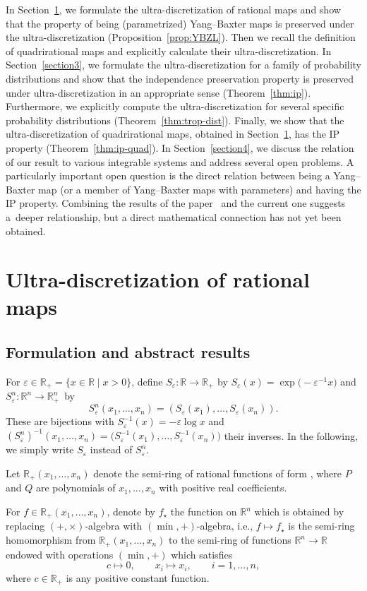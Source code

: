 \documentclass[pdftex]{sigma}
\numberwithin{equation}{section}
\def\R{\mathbb{R}}
\def\e{\varepsilon}
\begin{document}
In Section~\ref{section2}, we formulate the ultra-discretization of rational maps and show that the property of being (parametrized) Yang--Baxter maps is preserved under the ultra-discretization (Proposition~\ref{prop:YBZL}). Then we recall the definition of quadrirational maps and explicitly calculate their ultra-discretization. In Section~\ref{section3}, we formulate the ultra-discretization for a family of probability distributions and show that the independence preservation property is preserved under ultra-discretization in an appropriate sense (Theorem~\ref{thm:ip}). Furthermore, we explicitly compute the ultra-discretization for several specific probability distributions (Theorem~\ref{thm:trop-dist}). Finally, we show that the ultra-discretization of quadrirational maps, obtained in Section~\ref{section2}, has the IP property (Theorem~\ref{thm:ip-quad}). In Section~\ref{section4}, we discuss the relation of our result to various integrable systems and address several open problems. A particularly important open question is the direct relation between being a Yang--Baxter map (or a member of Yang--Baxter maps with parameters) and having the IP property. Combining the results of the paper~\cite{SU} and the current one suggests a~deeper relationship, but a direct mathematical connection has not yet been obtained.

\section{Ultra-discretization of rational maps}\label{section2}

\subsection{Formulation and abstract results}
For $\e\in\R_+\!=\!\{x\in\R\mid x>0\}$,
define $S_{\e}\colon\R\to\R_+$ by $S_{\e}(x)=\exp\bigl(-\e^{-1}x\bigr)$ and ${S_{\e}^n\colon \R^n\to\R_+^n}$~by%
\[
S_{\e}^n(x_1,\ldots,x_n)=(S_{\e}(x_1),\ldots,S_{\e}(x_n)).
\]
These are bijections with $S_{\e}^{-1}(x)=-\e\log x$ and
$(S_{\e}^n)^{-1}(x_1,\ldots,x_n)=\bigl(S_{\e}^{-1}(x_1),\ldots,S_{\e}^{-1}(x_n)\bigr)$ their inverses.
In the following, we simply write $S_{\e}$ instead of $S_{\e}^n$.

Let $\R_+(x_1,\ldots,x_n)$ denote the semi-ring of rational functions of
form , where $P$ and $Q$ are
polynomials of $x_1,\ldots,x_n$ with positive real coefficients.

For $f\in\R_+(x_1,\ldots,x_n)$, denote by $f_{\star}$ the function on $\R^n$ which is obtained by replacing $(+,\times)$-algebra with $(\min,+)$-algebra, i.e.,
$f\mapsto f_{\star}$ is the semi-ring homomorphism
from $\R_+(x_1,\ldots,x_n)$ to the semi-ring of functions $\R^n\to\R$ endowed with operations $(\min,+)$ which satisfies
\[
c\mapsto0,\qquad x_i\mapsto x_i,\qquad i=1,\ldots,n,
\]
where $c\in\R_+$ is any positive constant function.
\end{document}
